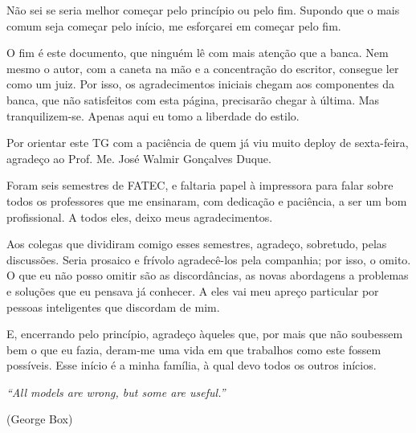 \documentclass[
  12pt,
  oneside,
  a4paper,
  chapter=TITLE,
  sumario=tradicional,
  english,
  brazil
]{abntex2}
\begin{document}

\begin{agradecimentos}

Não sei se seria melhor começar pelo princípio ou pelo fim. Supondo que o mais comum seja começar
pelo início, me esforçarei em começar pelo fim.

O fim é este documento, que ninguém lê com mais atenção que a banca. Nem mesmo o autor,
com a caneta na mão e a concentração do escritor, consegue ler como um juiz. Por isso,
os agradecimentos iniciais chegam aos componentes da banca, que não satisfeitos com esta página,
precisarão chegar à última. Mas tranquilizem-se. Apenas aqui eu tomo a liberdade do estilo.

Por orientar este TG com a paciência de quem já viu muito deploy de sexta-feira,
agradeço ao Prof. Me. José Walmir Gonçalves Duque.

Foram seis semestres de FATEC, e faltaria papel à impressora para falar sobre todos os professores
que me ensinaram, com dedicação e paciência, a ser um bom profissional. A todos eles, deixo meus agradecimentos.

Aos colegas que dividiram comigo esses semestres, agradeço, sobretudo, pelas discussões.
Seria prosaico e frívolo agradecê-los pela companhia; por isso, o omito. O que eu não posso omitir
são as discordâncias, as novas abordagens a problemas e soluções que eu pensava já conhecer.
A eles vai meu apreço particular por pessoas inteligentes que discordam de mim.

E, encerrando pelo princípio, agradeço àqueles que, por mais que não soubessem bem o que eu fazia,
deram-me uma vida em que trabalhos como este fossem possíveis. Esse início é a minha família, à qual devo todos os outros inícios.

\end{agradecimentos}

\begin{epigrafe}
  \vspace*{\fill}
  \begin{flushright}
    \textit{``All models are wrong, but some are useful.''}

    (George Box)
  \end{flushright}
\end{epigrafe}
\end{document}
